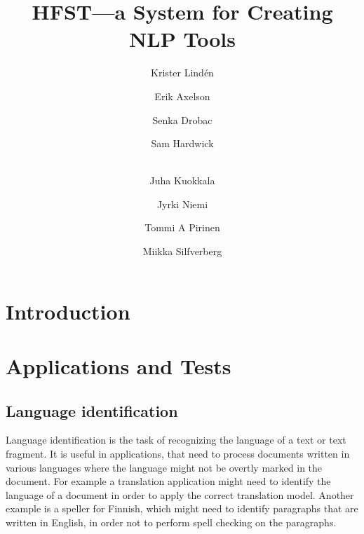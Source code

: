 \documentclass{llncs}
\begin{document}
%
\title{HFST---a System for Creating NLP Tools}
%
\author{Krister Lind\'{e}n \and Erik Axelson \and Senka Drobac \and Sam Hardwick \and\\
Juha Kuokkala \and Jyrki Niemi \and Tommi A Pirinen \and Miikka Silfverberg}


\maketitle


\begin{abstract}
\end{abstract}


\section*{Introduction}

\section{Applications and Tests}\label{hfst:structural-layout}

\subsection{Language identification}
Language identification is the task of recognizing the language of a
text or text fragment. It is useful in applications, that need to
process documents written in various languages where the language
might not be overtly marked in the document. For example a translation
application might need to identify the language of a document in order
to apply the correct translation model. Another example is a speller
for Finnish, which might need to identify paragraphs that are written in
English, in order not to perform spell checking on the paragraphs.
\end{document}
